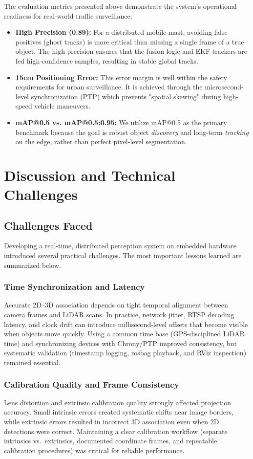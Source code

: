 \documentclass[12pt,a4paper]{report}
\begin{document}
The evaluation metrics presented above demonstrate the system's operational readiness for real-world traffic surveillance:
\begin{itemize}
    \item \textbf{High Precision (0.89):} For a distributed mobile mast, avoiding false positives (ghost tracks) is more critical than missing a single frame of a true object. The high precision ensures that the fusion logic and EKF trackers are fed high-confidence samples, resulting in stable global tracks.
    \item \textbf{15cm Positioning Error:} This error margin is well within the safety requirements for urban surveillance. It is achieved through the microsecond-level synchronization (PTP) which prevents "spatial skewing" during high-speed vehicle maneuvers.
    \item \textbf{mAP@0.5 vs. mAP@0.5:0.95:} We utilize mAP@0.5 as the primary benchmark because the goal is robust object \textit{discovery} and long-term \textit{tracking} on the edge, rather than perfect pixel-level segmentation.
\end{itemize}

\chapter{Discussion and Technical Challenges}
\section{Challenges Faced}
Developing a real-time, distributed perception system on embedded hardware introduced several practical challenges. The most important lessons learned are summarized below.

\subsection{Time Synchronization and Latency}
Accurate 2D--3D association depends on tight temporal alignment between camera frames and LiDAR scans. In practice, network jitter, RTSP decoding latency, and clock drift can introduce millisecond-level offsets that become visible when objects move quickly. Using a common time base (GPS-disciplined LiDAR time) and synchronizing devices with Chrony/PTP improved consistency, but systematic validation (timestamp logging, rosbag playback, and RViz inspection) remained essential.

\subsection{Calibration Quality and Frame Consistency}
Lens distortion and extrinsic calibration quality strongly affected projection accuracy. Small intrinsic errors created systematic shifts near image borders, while extrinsic errors resulted in incorrect 3D association even when 2D detections were correct. Maintaining a clear calibration workflow (separate intrinsics vs.\ extrinsics, documented coordinate frames, and repeatable calibration procedures) was critical for reliable performance.
\end{document}
